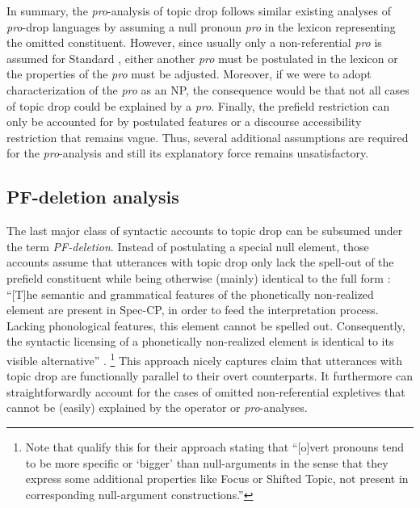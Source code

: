 In summary, the \textit{pro}-analysis of topic drop follows similar existing analyses of \textit{pro}-drop languages by assuming a null pronoun \textit{pro} in the lexicon representing the omitted constituent.
However, since usually only a non-referential \textit{pro} is assumed for Standard , either another \textit{pro} must be postulated in the lexicon or the properties of the  \textit{pro} must be adjusted.
Moreover, if we were to adopt  characterization of the \textit{pro} as an NP, the consequence would be that not all cases of topic drop could be explained by a \textit{pro}.
Finally, the prefield restriction can only be accounted for by postulated features or a discourse accessibility restriction that remains vague.
Thus, several additional assumptions are required for the \textit{pro}-analysis and still its explanatory force remains unsatisfactory.

\subsection{PF-deletion analysis}
The last major class of syntactic accounts to topic drop can be subsumed under the term \textit{PF-deletion}.
Instead of postulating a special null element, those accounts assume that utterances with topic drop only lack the spell-out of the prefield constituent while being otherwise (mainly) identical to the full form \citep{mornsjo2002,sigurdsson.maling2010,sigurdsson2011,nygard2018}:
``[T]he semantic and grammatical features of the phonetically non-realized element are present in Spec-CP, in order to feed the interpretation process. Lacking phonological features, this element cannot be spelled out. Consequently, the syntactic licensing of a phonetically non-realized element is identical to its visible alternative'' \citep[133--134]{mornsjo2002}.%
\footnote{Note that \citet[66]{sigurdsson.maling2010} qualify this for their approach stating that ``[o]vert pronouns tend to be more specific or `bigger' than null-arguments in the sense that they express some additional properties like Focus  or Shifted Topic, not present in corresponding null-argument constructions.''}
%
This approach nicely captures  claim that utterances with topic drop are functionally parallel to their overt counterparts.
It furthermore can straightforwardly account for the cases of omitted non-referential expletives  that cannot be (easily) explained by the operator or \textit{pro}-analyses.

